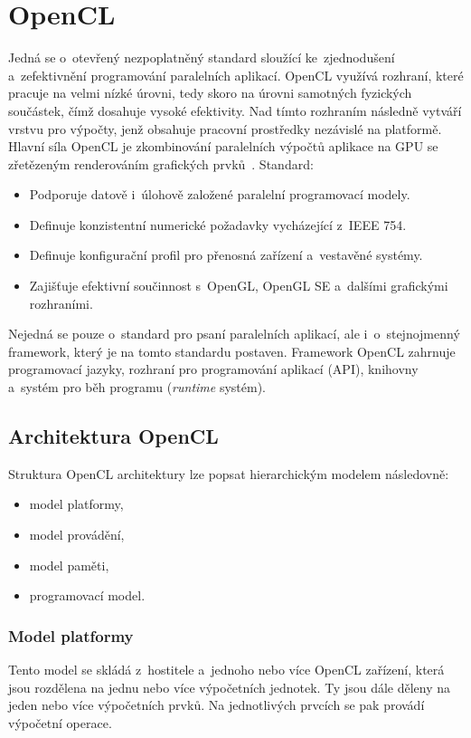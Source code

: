\section{OpenCL}
Jedná se o~otevřený nezpoplatněný standard sloužící ke~zjednodušení a~zefektivnění programování
paralelních aplikací. OpenCL využívá rozhraní, které pracuje na velmi nízké úrovni, tedy skoro na
úrovni samotných fyzických součástek, čímž dosahuje vysoké efektivity. Nad tímto rozhraním následně
vytváří vrstvu pro výpočty, jenž obsahuje pracovní prostředky nezávislé na platformě. Hlavní síla
OpenCL je zkombinování paralelních výpočtů aplikace na GPU se zřetězeným renderováním grafických
prvků~\cite{Khronos:2015}.
Standard:
\begin{itemize}
    \item Podporuje datově i~úlohově založené paralelní programovací modely.
    \item Definuje konzistentní numerické požadavky vycházející z~IEEE 754.
    \item Definuje konfigurační profil pro přenosná zařízení a~vestavěné systémy.
    \item Zajišťuje efektivní součinnost s~OpenGL, OpenGL SE a~dalšími grafickými
        rozhraními.
\end{itemize}
Nejedná se pouze o~standard pro psaní paralelních aplikací, ale i~o~stejnojmenný framework, který
je na tomto standardu postaven. Framework OpenCL zahrnuje programovací jazyky, rozhraní pro
programování aplikací (API), knihovny a~systém pro běh programu ({\it runtime} systém).
\subsection{Architektura OpenCL}
Struktura OpenCL architektury lze popsat hierarchickým modelem následovně:
\begin{itemize}
    \item model platformy,
    \item model provádění,
    \item model paměti,
    \item programovací model.
\end{itemize}

\subsubsection{Model platformy}
Tento model se skládá z~hostitele a~jednoho nebo více OpenCL zařízení, která jsou rozdělena na
jednu nebo více výpočetních jednotek. Ty jsou dále děleny na jeden nebo více výpočetních prvků.
Na jednotlivých prvcích se pak provádí výpočetní operace.

